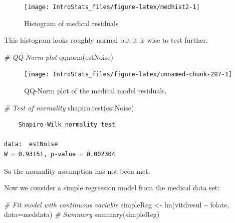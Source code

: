 \documentclass[
  oneside]{krantz}
\newenvironment{Shaded}{\begin{snugshade}}{\end{snugshade}}
\newcommand{\AttributeTok}[1]{\textcolor[rgb]{0.77,0.63,0.00}{#1}}
\newcommand{\CommentTok}[1]{\textcolor[rgb]{0.56,0.35,0.01}{\textit{#1}}}
\newcommand{\FunctionTok}[1]{\textcolor[rgb]{0.00,0.00,0.00}{#1}}
\newcommand{\NormalTok}[1]{#1}
\newcommand{\OtherTok}[1]{\textcolor[rgb]{0.56,0.35,0.01}{#1}}
\newcommand{\SpecialCharTok}[1]{\textcolor[rgb]{0.00,0.00,0.00}{#1}}
\begin{document}
\begin{figure}

{\centering \texttt{[image: IntroStats\_files/figure-latex/medhist2-1]} 

}

\caption{Histogram of medical residuals}\label{fig:medhist2}
\end{figure}

This histogram looks roughly normal but it is wise to test further.

\begin{Shaded}
\begin{Highlighting}[]
\CommentTok{\# QQ{-}Norm plot}
\FunctionTok{qqnorm}\NormalTok{(estNoise)}
\end{Highlighting}
\end{Shaded}

\begin{figure}

{\centering \texttt{[image: IntroStats\_files/figure-latex/unnamed-chunk-287-1]} 

}

\caption{QQ-Norm plot of the medical model residuals.}\label{fig:unnamed-chunk-287}
\end{figure}

\begin{Shaded}
\begin{Highlighting}[]
\CommentTok{\# Test of normality}
\FunctionTok{shapiro.test}\NormalTok{(estNoise)}
\end{Highlighting}
\end{Shaded}

\begin{verbatim}
    Shapiro-Wilk normality test

data:  estNoise
W = 0.93151, p-value = 0.002304
\end{verbatim}

So the normality assumption has not been met.

Now we consider a simple regression model from the medical data set:

\begin{Shaded}
\begin{Highlighting}[]
\CommentTok{\# Fit model with continuous variable}
\NormalTok{simpleReg }\OtherTok{\textless{}{-}} \FunctionTok{lm}\NormalTok{(vitdresul }\SpecialCharTok{\textasciitilde{}}\NormalTok{ folate, }\AttributeTok{data=}\NormalTok{meddata)}
\CommentTok{\# Summary}
\FunctionTok{summary}\NormalTok{(simpleReg)}
\end{Highlighting}
\end{Shaded}
\end{document}
